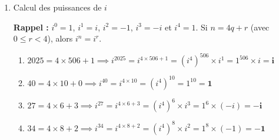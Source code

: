 \documentclass[12pt,a4paper]{article}
\begin{document}
\begin{enumerate}
\begin{enumerate}
    C'est un nombre \textbf{imaginaire pur}.

    \item $z_5 = (2 + i\sqrt{3})(\sqrt{3} - i)$

    $    
\begin{aligned}
        z_5 &= 2\sqrt{3} - 2i + i\sqrt{3}\cdot\sqrt{3} - i^2\sqrt{3} \\
        &= 2\sqrt{3} - 2i + 3i + \sqrt{3} \\
        &= 3\sqrt{3} + i
\end{aligned}
$

    C'est un nombre complexe quelconque.

    \item $z_6 = (2 + 5i)^2$

    $    
\begin{aligned}
        z_6 &= 2^2 + 2(2)(5i) + (5i)^2 \\
        &= 4 + 20i + 25i^2 \\
        &= 4 + 20i - 25 \\
        &= -21 + 20i
\end{aligned}
$

    C'est un nombre complexe quelconque.

    \item $z_7 = \dfrac{3 - 3i}{1 + i}$

    $    
\begin{aligned}
        z_7 &= \frac{(3 - 3i)(1 - i)}{(1 + i)(1 - i)} \\
        &= \frac{3 - 3i - 3i + 3i^2}{1^2 - i^2} \\
        &= \frac{3 - 6i - 3}{2} \\
        &= \frac{-6i}{2} \\
        &= -3i
\end{aligned}
$

    C'est un nombre \textbf{imaginaire pur}.
\end{enumerate}

\item Calcul des puissances de $i$

\textbf{Rappel :} $i^0 = 1$, $i^1 = i$, $i^2 = -1$, $i^3 = -i$ et $i^4 = 1$. Si $n = 4q + r$ (avec $0 \le r < 4$), alors $i^n = i^r$.

\begin{enumerate}
    \item $2025 = 4 \times 506 + 1 \implies i^{2025} = i^{4 \times 506 + 1} =(i^4)^{506} \times i^1 = 1^{506} \times i = \mathbf{i}$
    \item $40 = 4 \times 10 + 0 \implies i^{40} = i^{4 \times 10} =(i^4)^{10} = 1^{10} = \mathbf{1}$
    \item $27 = 4 \times 6 + 3 \implies i^{27} = i^{4 \times 6 + 3} = (i^4)^6 \times i^3 = 1^6 \times (-i) = \mathbf{-i}$
    \item $34 = 4 \times 8 + 2 \implies i^{34} = i^{4 \times 8 + 2} =(i^4)^8 \times i^2 = 1^8 \times (-1) = \mathbf{-1}$
\end{enumerate}

\end{enumerate}
\end{document}

